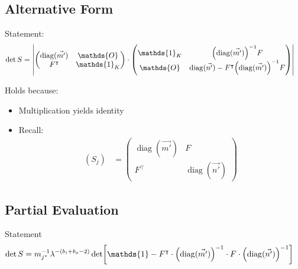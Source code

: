 \documentclass[
	english,
	a4paper,
	fontsize=10pt,
	parskip=half,
	titlepage=true,
	DIV=12,
	final
]{scrreprt}
\newcommand*{\transp}{\ensuremath{^\intercal}}
\DeclareMathOperator{\diag}{diag}
\begin{document}
\subsection{Alternative Form}
Statement:
\begin{align}
	\det S
&=
	\mqty|
		\begin{pmatrix}
			\diag(\vec{m'})	& \mathds{O}			\\
			F\transp			    & \mathds{1}_{K}
		\end{pmatrix}
		\cdot
		\begin{pmatrix}
			\mathds{1}_K		&	\qty(\diag(\vec{m'}))^{-1} F		\\
			\mathds{O}			&	\diag(\vec{n'}) - F\transp \qty(\diag(\vec{m'}))^{-1} F
		\end{pmatrix}
	|
	\label{eqn:detSAlt}
\end{align}

Holds because:
\begin{itemize}
\item Multiplication yields identity
\item Recall:
\begin{align}
	(S_j)
&=
	\begin{pmatrix}
		\diag(\vec{m'}) & F 			\\
		F\transp & \diag(\vec{n'})
	\end{pmatrix}
\end{align}
\end{itemize}

\subsection{Partial Evaluation}
Statement
\begin{align}
	\det S
&=
	m_{j^*}^{-1} \lambda^{-(b_i + b_o - 2)}
	\det[
		\mathds{1} -
		F\transp \cdot 
		\qty( \diag(\vec{m'}) )^{-1} \cdot
		F \cdot \qty( \diag(\vec{n'}) )^{-1}
	]
\label{eqn:detSPrimePartial}
\end{align}
\end{document}
